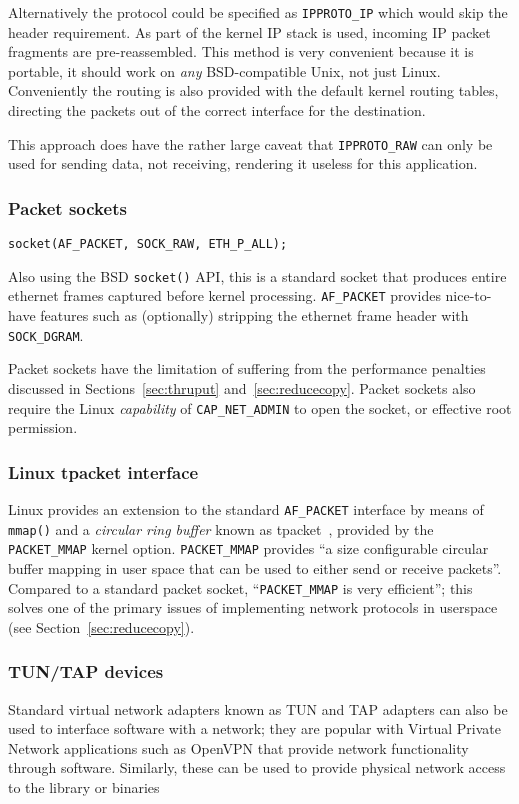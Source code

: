 \documentclass[11pt,a4paper,british]{bhamarticle}
\begin{document}
\begin{multicols}{2}
Alternatively the protocol could be specified as \texttt{IPPROTO\_IP} which would skip the header requirement. As part of the kernel IP stack is used, incoming IP packet fragments are pre-reassembled. This method is very convenient because it is portable, it should work on \textit{any} BSD-compatible Unix, not just Linux. Conveniently the routing is also provided with the default kernel routing tables, directing the packets out of the correct interface for the destination.

This approach does have the rather large caveat that \texttt{IPPROTO\_RAW} can only be used for sending data, not receiving, rendering it useless for this application.

\subsubsection{Packet sockets}
\begin{Verbatim}[fontsize=\small]
socket(AF_PACKET, SOCK_RAW, ETH_P_ALL);
\end{Verbatim}
Also using the BSD \texttt{socket()} API, this is a standard socket that produces entire ethernet frames captured before kernel processing. \texttt{AF\_PACKET} provides nice-to-have features such as (optionally) stripping the ethernet frame header with \texttt{SOCK\_DGRAM}.

Packet sockets have the limitation of suffering from the performance penalties discussed in Sections~\ref{sec:thruput} and~\ref{sec:reducecopy}. Packet sockets also require the Linux \textit{capability} of \texttt{CAP\_NET\_ADMIN} to open the socket, or effective root permission.

\subsubsection{Linux tpacket interface}
Linux provides an extension to the standard \texttt{AF\_PACKET} interface by means of \texttt{mmap()} and a \textit{circular ring buffer} known as tpacket~\cite{tpacket}, provided by the \texttt{PACKET\_MMAP} kernel option. \texttt{PACKET\_MMAP} provides ``a size configurable circular buffer mapping in user space that can be used to either send or receive packets''. Compared to a standard packet socket, ``\texttt{PACKET\_MMAP} is very efficient''; this solves one of the primary issues of implementing network protocols in userspace (see Section~\ref{sec:reducecopy}).

\subsubsection{TUN/TAP devices}
Standard virtual network adapters known as TUN and TAP adapters can also be used to interface software with a network; they are popular with Virtual Private Network applications such as OpenVPN that provide network functionality through software. Similarly, these can be used to provide physical network access to the library or binaries


\end{multicols}
\end{document}
